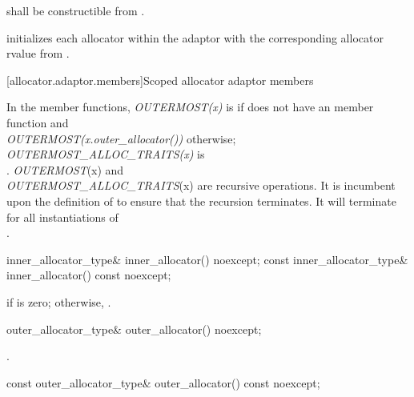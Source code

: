\begin{itemdescr}
\pnum
\requires {} shall be constructible from .

\pnum
\effects initializes each allocator within the adaptor with the corresponding allocator rvalue
from .
\end{itemdescr}

[allocator.adaptor.members]{Scoped allocator adaptor members}

\pnum
In the  member functions,
\textit{OUTERMOST(x)} is  if  does not have an
 member function and \\
\textit{OUTERMOST(x.outer_allocator())}
otherwise;
\textit{OUTERMOST_ALLOC_TRAITS(x)} is \\
.
\enternote \textit{OUTERMOST}(x) and \\
\textit{OUTERMOST_ALLOC_TRAITS}(x) are recursive operations. It
is incumbent upon the definition of  to ensure that the
recursion terminates. It will terminate for all instantiations of \\
. \exitnote

%
%
\begin{itemdecl}
inner_allocator_type& inner_allocator() noexcept;
const inner_allocator_type& inner_allocator() const noexcept;
\end{itemdecl}

\begin{itemdescr}
\pnum
\returns {} if  is zero; otherwise,
.
\end{itemdescr}

%
%
\begin{itemdecl}
outer_allocator_type& outer_allocator() noexcept;
\end{itemdecl}

\begin{itemdescr}
\pnum
\returns {}.
\end{itemdescr}

%
%
\begin{itemdecl}
const outer_allocator_type& outer_allocator() const noexcept;
\end{itemdecl}

